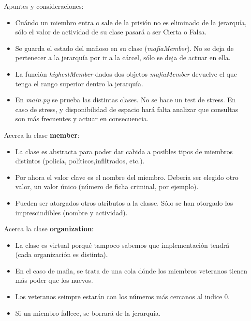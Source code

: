 \documentclass[a4paper]{letter}
\begin{document}
 \pagestyle{empty} 

Apuntes y consideraciones:\\

\begin{itemize}
\item Cuándo un miembro entra o sale de la prisión no es eliminado de la jerarquía, sólo el valor de actividad de su clase pasará a ser Cierta o Falsa.
\item Se guarda el estado del mafioso en su clase (\emph{mafiaMember}). No se deja de pertenecer a la jerarquía por ir a la cárcel, sólo se deja de actuar en ella.
\item La función \emph{highestMember} dados dos objetos \emph{mafiaMember} devuelve el que tenga el rango superior dentro la jerarquía.
\item En \emph{main.py} se prueba las distintas clases. No se hace un test de stress. En caso de stress, y disponibilidad de espacio hará falta analizar que consultas son más frecuentes y actuar en consecuencia.\\ 
\end{itemize}

Acerca la clase \textbf{member}:\\

\begin{itemize}
\item La clase es abstracta para poder dar cabida a posibles tipos de miembros distintos (policía, políticos,infiltrados, etc.).
\item Por ahora el valor clave es el nombre del miembro. Debería ser elegido otro valor, un valor único (número de ficha criminal, por ejemplo).
\item Pueden ser atorgados otros atributos a la classe. Sólo se han otorgado los imprescindibles (nombre y actividad).\\
\end{itemize}

Acerca la clase \textbf{organization}:\\

\begin{itemize}
\item La clase es virtual porqué tampoco sabemos que implementación tendrá (cada organización es distinta).
\item En el caso de mafia, se trata de una cola dónde los miembros veteranos tienen más poder que los nuevos.
\item Los veteranos seimpre estarán con los números más cercanos al indice 0.
\item Si un miembro fallece, se borrará de la jerarquía.\\
\end{itemize}
\end{document}
